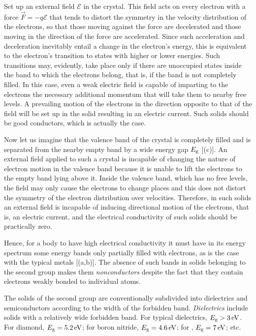 Set up an external field $\pmb{\mathscr{E}}$ in the crystal. This field acts on every electron with a force $\vec{F}=-q\pmb{\mathscr{E}}$ that tends to distort the symmetry in the velocity distribution of the electrons, so that those moving against the force are decelerated and those moving in the direction of the force are accelerated. Since such acceleration and deceleration
inevitably entail a change in the electron's energy, this is equivalent to the electron's transition to states with higher or lower energies. Such transitions may, evidently, take place only if there are unoccupied states inside the band to which the electrons belong, that is, if the band is not completely filled. In this case, even a weak electric field is capable of imparting to the electrons the necessary additional momentum that will take them to nearby free levels. A prevailing motion of the electrons in the direction opposite to that of the field will be set up in the solid resulting in an electric current. Such solids should be good conductors, which is actually the case.

Now let us imagine that the valence band of the crystal is completely filled and is separated from the nearby empty band by a wide energy gap $E_{\text{g}}$ [(c)]. An external field applied to such a crystal is incapable of changing the nature of electron motion in the valence band because it is unable to lift the electrons to the empty band lying above it. Inside the valence band, which has no free levels, the field may only cause the electrons to change places and this
does not distort the symmetry of the electron distribution over velocities. Therefore, in such solids an external field is incapable of inducing directional motion of the electrons, that is, an electric current, and the electrical conductivity of such solids should be practically zero.

Hence, for a body to have high electrical conductivity it must have in its energy spectrum some energy bands only partially filled with electrons, as is the case with the typical metals [(a,b)]. The absence of such bands in solids belonging to the second group makes them \textit{nonconductors} despite the fact that they contain electrons weakly bonded to individual atoms.

The solids of the second group are conventionally subdivided into dielectrics and semiconductors according to the width of the forbidden band. \textit{Dielectrics} include solids with a relatively wide forbidden band. For typical dielectrics, $E_{\text{g}}>\SI{3}{\electronvolt}$. For diamond, $E_{\text{g}}=\SI{5.2}{\electronvolt}$; for boron nitride, $E_{\text{g}}=\SI{4.6}{\electronvolt}$; for , $E_{\text{g}}=\SI{7}{\electronvolt}$; etc.

